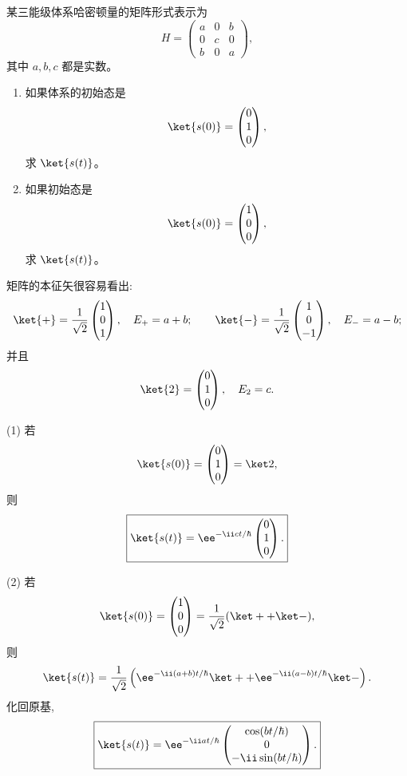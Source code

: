 \begin{question}
某三能级体系哈密顿量的矩阵形式表示为
\[
H=\begin{pmatrix}
a&0&b\\
0&c&0\\
b&0&a
\end{pmatrix},
\]
其中 $a,b,c$ 都是实数。
\begin{enumerate}
\item 如果体系的初始态是
\[
\ket{s(0)}=\begin{pmatrix}0\\1\\0\end{pmatrix},
\]
求 $\ket{s(t)}$。
\item 如果初始态是
\[
\ket{s(0)}=\begin{pmatrix}1\\0\\0\end{pmatrix},
\]
求 $\ket{s(t)}$。
\end{enumerate}
\end{question}
\begin{solution}
矩阵的本征矢很容易看出:
\[
\ket{+}=\frac1{\sqrt2}\begin{pmatrix}1\\0\\1\end{pmatrix},
\quad E_+=a+b;
\qquad
\ket{-}=\frac1{\sqrt2}\begin{pmatrix}1\\0\\-1\end{pmatrix},
\quad E_-=a-b;
\]
并且
\[
\ket{2}=\begin{pmatrix}0\\1\\0\end{pmatrix},
\quad E_2=c.
\]

(1) 若
\[
\ket{s(0)}=\begin{pmatrix}0\\1\\0\end{pmatrix}=\ket2,
\]
则
\[
\boxed{\ket{s(t)}=\ee^{-\ii ct/\hbar}\begin{pmatrix}0\\1\\0\end{pmatrix}.}
\]

(2) 若
\[
\ket{s(0)}=\begin{pmatrix}1\\0\\0\end{pmatrix}
=\frac1{\sqrt2}(\ket+ +\ket-),
\]
则
\[
\ket{s(t)}=\frac1{\sqrt2}\left(\ee^{-\ii(a+b)t/\hbar}\ket+
+\ee^{-\ii(a-b)t/\hbar}\ket-\right).
\]
化回原基,
\[
\boxed{\ket{s(t)}=\ee^{-\ii at/\hbar}
\begin{pmatrix}
\cos(bt/\hbar)\\0\\-\ii\sin(bt/\hbar)
\end{pmatrix}.}
\]
\end{solution}

